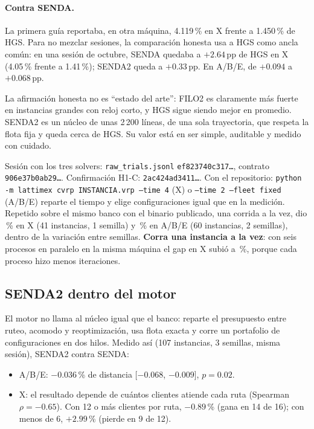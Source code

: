 \documentclass[11pt,a4paper]{article}
\newcommand{\senda}{SENDA}
\newcommand{\sendados}{SENDA2}
\newcommand{\pp}{\,pp}
\newcommand{\tsl}[1]{\texttt{\small #1}}
\begin{document}
\paragraph{Contra \senda.} La primera guía reportaba, en otra máquina, 4.119\,\% en X frente a
1.450\,\% de HGS. Para no mezclar sesiones, la comparación honesta usa a HGS como ancla común: en una
sesión de octubre, \senda{} quedaba a $+2.64$\pp{} de HGS en X (4.05\,\% frente a 1.41\,\%);
\sendados{} queda a $+0.33$\pp. En A/B/E, de $+0.094$ a $+0.068$\pp.

\begin{ideaclave}
La afirmación honesta no es ``estado del arte'': FILO2 es claramente más fuerte en instancias grandes
con reloj corto, y HGS sigue siendo mejor en promedio. \sendados{} es un núcleo de unas 2\,200 líneas,
de una sola trayectoria, que respeta la flota fija y queda cerca de HGS. Su valor está en ser simple,
auditable y medido con cuidado.
\end{ideaclave}

\begin{reproducir}
Sesión con los tres solvers: \tsl{raw\_trials.jsonl} \tsl{ef823740c317\ldots}, contrato
\tsl{906e37b0ab29\ldots}. Confirmación H1-C: \tsl{2ac424ad3411\ldots}. Con el repositorio:
\tsl{python -m lattimex cvrp INSTANCIA.vrp --time 4} (X) o \tsl{--time 2 --fleet fixed} (A/B/E)
reparte el tiempo y elige configuraciones igual que en la medición. Repetido sobre el mismo banco con
el binario publicado, una corrida a la vez, dio \ReproX\,\% en X (41 instancias, 1 semilla) y
\ReproABE\,\% en A/B/E (60 instancias, 2 semillas), dentro de la variación entre semillas.
\textbf{Corra una instancia a la vez}: con seis procesos en paralelo en la misma máquina el gap en X
subió a \ReproXParalelo\,\%, porque cada proceso hizo menos iteraciones.
\end{reproducir}

\subsection{\sendados{} dentro del motor}
\label{sec:motor-ruteo}

El motor no llama al núcleo igual que el banco: reparte el presupuesto entre ruteo, acomodo y
reoptimización, usa flota exacta y corre un portafolio de configuraciones en dos hilos. Medido así
(107 instancias, 3 semillas, misma sesión), \sendados{} contra \senda{}:

\begin{itemize}[leftmargin=1.5em]
\item A/B/E: $-0.036$\,\% de distancia [$-0.068$, $-0.009$], $p=0.02$.
\item X: el resultado depende de cuántos clientes atiende cada ruta (Spearman $\rho=-0.65$). Con 12 o
más clientes por ruta, $-0.89$\,\% (gana en 14 de 16); con menos de 6, $+2.99$\,\% (pierde en 9 de 12).
\end{itemize}
\end{document}

